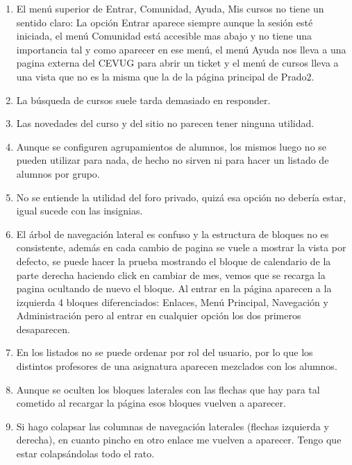 \begin{enumerate}
\item El menú superior de Entrar, Comunidad, Ayuda, Mis cursos no tiene un sentido claro: La opción Entrar aparece siempre aunque la sesión esté iniciada, el menú Comunidad está accesible mas abajo y no tiene una importancia tal y como aparecer en ese menú, el menú Ayuda nos lleva a una pagina externa del CEVUG para abrir un ticket y el menú de cursos lleva a una vista que no es la misma que la de la página principal de Prado2.

\item La búsqueda de cursos suele tarda demasiado en responder.

\item Las novedades del curso y del sitio no parecen tener ninguna utilidad.

\item Aunque se configuren agrupamientos de alumnos, los mismos luego no se pueden utilizar para nada, de hecho no sirven ni para hacer un listado de alumnos por grupo.

\item No se entiende la utilidad del foro privado, quizá esa opción no debería estar, igual sucede con las insignias.

\item El árbol de navegación lateral es confuso y la estructura de bloques no es consistente, además en cada cambio de pagina se vuele a mostrar la vista por defecto, se puede hacer la prueba mostrando el bloque de calendario de la parte derecha haciendo click en cambiar de mes, vemos que se recarga la pagina ocultando de nuevo el bloque. Al entrar en la página aparecen a la izquierda 4 bloques diferenciados: Enlaces, Menú Principal, Navegación y Administración pero al entrar en cualquier opción los dos primeros desaparecen.

\item En los listados no se puede ordenar por rol del usuario, por lo que los distintos profesores de una asignatura aparecen mezclados con los alumnos.

\item Aunque se oculten los bloques laterales con las flechas que hay para tal cometido al recargar la página esos bloques vuelven a aparecer.


\item Si hago colapsar las columnas de navegación laterales (flechas izquierda y derecha), en cuanto pincho en otro enlace me vuelven a aparecer. Tengo que estar colapsándolas todo el rato.


\end{enumerate}
